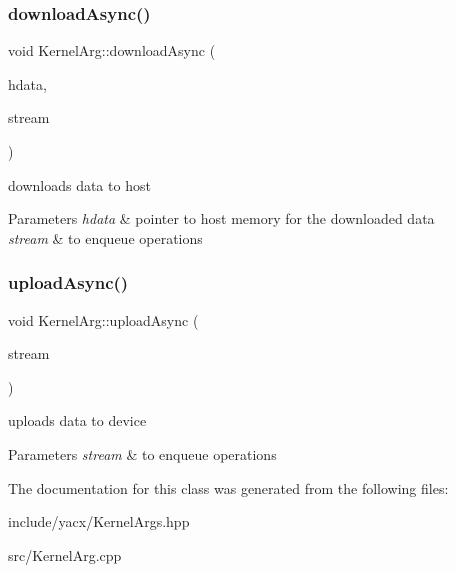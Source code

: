 \subsubsection{\texorpdfstring{download\+Async()}{downloadAsync()}\hspace{0.1cm}{\footnotesize\ttfamily [2/2]}}
{\footnotesize\ttfamily void Kernel\+Arg\+::download\+Async (\begin{DoxyParamCaption}\item[{void $\ast$}]{hdata,  }\item[{C\+Ustream}]{stream }\end{DoxyParamCaption})}

downloads data to host 
\begin{DoxyParams}{Parameters}
{\em hdata} & pointer to host memory for the downloaded data \\
\hline
{\em stream} & to enqueue operations \\
\hline
\end{DoxyParams}
\mbox{\label{classyacx_1_1_kernel_arg_a28c10b39d51a27d30e0f3e60b6aea41e}} 
\subsubsection{\texorpdfstring{upload\+Async()}{uploadAsync()}}
{\footnotesize\ttfamily void Kernel\+Arg\+::upload\+Async (\begin{DoxyParamCaption}\item[{C\+Ustream}]{stream }\end{DoxyParamCaption})}

uploads data to device 
\begin{DoxyParams}{Parameters}
{\em stream} & to enqueue operations \\
\hline
\end{DoxyParams}


The documentation for this class was generated from the following files\+:\begin{DoxyCompactItemize}
\item 
include/yacx/Kernel\+Args.\+hpp\item 
src/Kernel\+Arg.\+cpp\end{DoxyCompactItemize}
